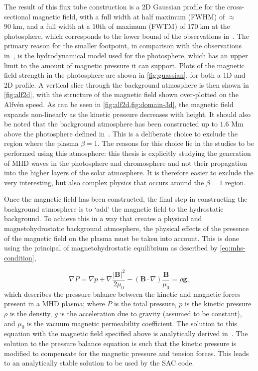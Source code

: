 \documentclass[a4paper,12pt,fourier,authoryear,custommargin]{Classes/PhDThesisPSnPDF}
\renewcommand{\vec}{\mathbf}
\begin{document}
The result of this flux tube construction is a 2D Gaussian profile for the cross-sectional magnetic field, with a full width at half maximum (FWHM) of $\approx$ $90 \; \mathrm{km}$, and a full width at a 10th of maximum (FWTM) of $170 \; \mathrm{km}$
at the photosphere, which corresponds to the lower bound of the observations in~\cite{sanchezalmeida2004}.
The primary reason for the smaller footpoint, in comparison with the observations in~\cite{utz2013}, is the hydrodynamical model used for the photosphere, which has an upper limit to the amount of magnetic pressure it can support.
Plots of the magnetic field strength in the photosphere are shown in \cref{fig:guassian}, for both a 1D and 2D profile.
A vertical slice through the background atmosphere is then shown in \cref{fig:alf2d}, with the structure of the magnetic field shown over-plotted on the Alfv\'en speed.
As can be seen in \cref{fig:alf2d,fig:domain-3d}, the magnetic field expands non-linearly as the kinetic pressure decreases with height.
It should also be noted that the background atmosphere has been constructed up to $1.6$ Mm above the photosphere defined in~\cite{vernazza1981}.
This is a deliberate choice to exclude the region where the plasma $\beta = 1$.
The reasons for this choice lie in the studies to be performed using this atmosphere: this thesis is explicitly studying the generation of MHD waves in the photosphere and chromosphere and not their propagation into the higher layers of the solar atmosphere.
It is therefore easier to exclude the very interesting, but also complex physics that occurs around the $\beta = 1$ region.

Once the magnetic field has been constructed, the final step in constructing the background atmosphere is to `add' the magnetic field to the hydrostatic background.
To achieve this in a way that creates a physical and magnetohydrostatic background atmosphere, the physical effects of the presence of the magnetic field on the plasma must be taken into account.
This is done using the principal of magnetohydrostatic equilibrium as described by \cref{eq:mhs-condition},

\begin{equation}
\nabla P =
\nabla p + \nabla \frac{|\vec{B}|^2}{2\mu_0} - (\vec{B}\cdot\nabla)
{\frac{\vec{B}}{\mu_0} }
= \rho \vec{g},
\label{eq:mhs-condition}
\end{equation}
which describes the pressure balance between the kinetic and magnetic forces present in a MHD plasma;
where $P$ is the total pressure, $p$ is the kinetic pressure $\rho$ is the density, $g$ is the acceleration due to gravity (assumed to be constant), and $\mu_0$ is the vacuum magnetic permeability coefficient.
The solution to this equation with the magnetic field specified above is analytically derived in~\cite{gent2013,gent2014}.
The solution to the pressure balance equation is such that the kinetic pressure is modified to compensate for the magnetic pressure and tension forces.
This leads to an analytically stable solution to be used by the SAC code. 
\end{document}
